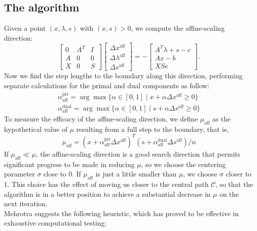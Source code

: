 \documentclass[a4paper,10 pt,titlepage,twoside]{book}
\theoremstyle{plain}
\theoremstyle{definition}
\theoremstyle{remark}
\begin{document}
\subsection*{The algorithm}
Given a point $(x, \lambda, s)$ with $(x, s)> 0$, we compute the affine-scaling direction:
\begin{equation}\label{(A)}
\begin{bmatrix}
0&A^{T}&I \\A&0&0\\X&0&S
\end{bmatrix}\begin{bmatrix}
\Delta x^{\text{aff}}\\\Delta\lambda^{\text{aff}}\\\Delta s^{\text{aff}}
\end{bmatrix}=-\begin{bmatrix}
A^{T}\lambda+s-c\\Ax-b\\XSe
\end{bmatrix}.
\end{equation}
Now we find the step lengths to the boundary along this direction, performing separate calculations for the primal and dual components as follow:
\begin{align}\label{Qw}
\alpha_{\text{aff}}^{\text{pri}}=\arg\max\{\alpha\in[0,1]\;|\;x +\alpha\Delta x^{\text{aff}}\geq 0\} \\
\alpha_{\text{aff}}^{\text{dual}}=\arg\max\{\alpha\in[0,1]\;|\;s +\alpha\Delta s^{\text{aff}}\geq 0\}
\end{align}
To measure the efficacy of the affine-scaling direction, we define $\mu_{\text{aff}}$ as the hypothetical value of $\mu$ resulting from a full step to the boundary, that is,
\begin{equation*}
	\mu_{\text{aff}}= (x+\alpha_{\text{aff}}^{\text{pri}}\Delta x^{\text{aff}})^{T}(s+\alpha_{\text{aff}}^{\text{dual}}\Delta s^{\text{aff}})/n
\end{equation*}
If $\mu_{\text{aff}}\ll\mu$, the affine-scaling direction is a good search direction that permits significant progress to be made in reducing $\mu$, so we choose the centering parameter $\sigma$ close to 0. If $\mu_{\text{aff}}$ is just a little smaller than $\mu$, we choose $\sigma$ closer to 1. This choice has the effect of moving us closer  to the central path $\mathcal{C}$, so that the algorithm is in a better position to achieve a substantial decrease in $\mu$ on the next iteration.\\
Mehrotra \cite{MER} suggests the following heuristic, which has proved to be effective in exhaustive computational testing:
\end{document}

